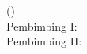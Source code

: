\begin{center}
  \textbf{\judulTA}\par
  \vspace{0.4cm}
  \MakeUppercase{\namaPenulis} (\nomorInduk)\\
  Pembimbing I: \pembimbingSatu\\
  Pembimbing II: \pembimbingDua
\end{center}
